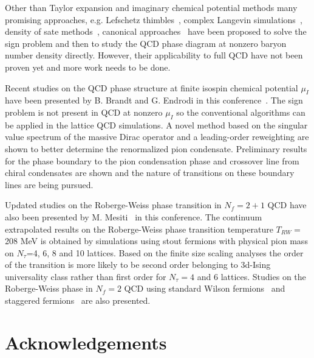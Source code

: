 \documentclass{PoS}
\begin{document}
Other than Taylor expansion and imaginary chemical potential methods many promising approaches, e.g. Lefschetz thimbles~\cite{Cristoforetti:2012su,Scorzato:2015qts}, complex Langevin simulations~\cite{Aarts:2009uq,Aarts:2017vrv}, density of sate methods~\cite{Langfeld:2012ah,Langfeld:2016kty}, canonical approaches~\cite{Nakamura:2015jra,Bornyakov:2016wld} have been proposed to solve the sign problem and then to study the QCD phase diagram at nonzero baryon number density directly. However, their applicability to full QCD have not been proven yet and more work needs to be done.

 
Recent studies on the QCD phase structure at finite isospin chemical potential $\mu_I$ have been presented by B. Brandt and G. Endrodi in this conference~\cite{Brandt:2016zdy}.
The sign problem is not present in QCD at nonzero $\mu_I$ so the conventional algorithms can be applied in the lattice QCD simulations. 
A novel method based on the singular value spectrum of the massive Dirac operator and a leading-order reweighting are shown to better determine the renormalized pion condensate.
Preliminary results for the phase boundary to the pion condensation phase and crossover line from chiral condensates are shown and the nature of transitions on these boundary lines are being pursued. 


Updated studies on the Roberge-Weiss phase transition in $N_f=2+1$ QCD have also been presented by M. Mesiti~\cite{Bonati:2016pwz} in this conference.
The continuum extrapolated results on the Roberge-Weiss phase transition temperature $T_{RW}=$208 MeV is obtained by simulations using stout fermions with physical pion mass on $N_\tau$=4, 6, 8 and 10 lattices.
Based on the finite size scaling analyses the order of the transition is more likely to be second order belonging to 3d-Ising universality class rather than first order for $N_\tau=4$ and 6 lattices.
Studies on the Roberge-Weiss phase in $N_f=2$ QCD using standard Wilson fermions~\cite{Cuteri:2015qkq} and staggered fermions~\cite{Philipsen:2016swy} are also presented.


\vspace{-0.2cm}

\section*{Acknowledgements}
\end{document}
